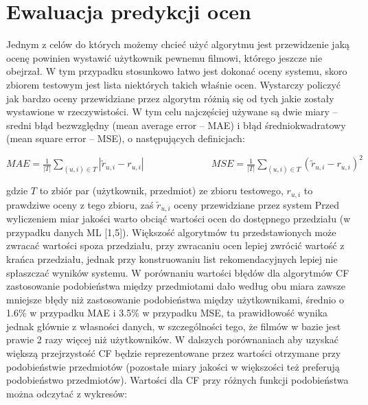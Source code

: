 \documentclass{pracamgr}
\begin{document}
  \section{Ewaluacja predykcji ocen}
   Jednym z celów do których możemy chcieć użyć algorytmu jest przewidzenie jaką ocenę powinien wystawić użytkownik pewnemu filmowi, którego jeszcze nie obejrzał.
   W tym przypadku stosunkowo łatwo jest dokonać oceny systemu, skoro zbiorem testowym jest lista niektórych takich właśnie ocen.
   Wystarczy policzyć jak bardzo oceny przewidziane przez algorytm różnią się od tych jakie zostały wystawione w rzeczywistości.
   W tym celu najczęściej używane są dwie miary -- sredni błąd bezwzględny (mean average error -- MAE) i błąd średniokwadratowy (mean square error -- MSE),
   o następujących definicjach:\newline
   \begin{center}
    $
    MAE=\frac{1}{|T|}\sum\limits_{(u,i)\in T}|\tilde{r}_{u,i}-r_{u,i}|\quad\quad\quad\quad\quad\quad\quad
    MSE=\frac{1}{|T|}\sum\limits_{(u,i)\in T}(\tilde{r}_{u,i}-r_{u,i})^2
    $
   \end{center}
   {\scriptsize
    gdzie $T$ to zbiór par (użytkownik, przedmiot) ze zbioru testowego, $r_{u,i}$ to prawdziwe oceny z tego zbioru,\newline
    zaś $\tilde{r}_{u,i}$ oceny przewidziane przez system
   }\newline
   Przed wyliczeniem miar jakości warto obciąć wartości ocen do dostępnego przedziału (w przypadku danych ML [1,5]).%
   Większość algorytmów tu przedstawionych może zwracać wartości spoza przedziału, przy zwracaniu ocen lepiej zwrócić wartość z krańca przedziału,
   jednak przy konstruowaniu list rekomendacyjnych lepiej nie spłaszczać wyników systemu.
   W porównaniu wartości błędów dla algorytmów CF zastosowanie podobieństwa między przedmiotami dało według obu miara zawsze mniejsze błędy
   niż zastosowanie podobieństwa między użytkownikami, średnio o 1.6\% w przypadku MAE i 3.5\% w przypadku MSE, ta prawidłowość wynika jednak głównie
   z własności danych, w szczególności tego, że filmów w bazie jest prawie 2 razy więcej niż użytkowników. W dalszych porównaniach aby uzyskać większą
   przejrzystość CF będzie reprezentowane przez wartości otrzymane przy podobieństwie przedmiotów
   (pozostałe miary jakości w większości też preferują podobieństwo przedmiotów).
   Wartości dla CF przy różnych funkcji podobieństwa można odczytać z wykresów:
\end{document}
